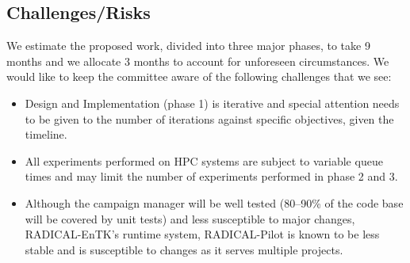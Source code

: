 \subsection{Challenges/Risks}

We estimate the proposed work, divided into three major phases, to take 9 months and we allocate 3 months to account for unforeseen circumstances. We would like to keep the committee aware of the following challenges that we see:

\begin{itemize}
	\item Design and Implementation (phase 1) is iterative and special attention needs to be given to the number of iterations against specific objectives, given the timeline.
    \item All experiments performed on HPC systems are subject to variable queue times and may limit the number of experiments performed in phase 2 and 3.
	\item Although the campaign manager will be well tested (80--90\% of the code base will be covered by unit tests) and less susceptible to major changes, RADICAL-EnTK's runtime system, RADICAL-Pilot is known to be less stable and is susceptible to changes as it serves multiple projects.
\end{itemize}